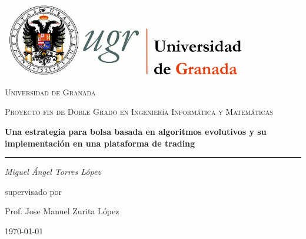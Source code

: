 	\afterpage{\blankpage}
	\begin{titlepage}
		\centering
		\includegraphics[width=0.8\textwidth]{imagenes/logo_ugr.jpg}\par\vspace{1cm}
		{\scshape\LARGE Universidad de Granada \par}
		\vspace{1cm}
		{\scshape\Large Proyecto fin de Doble Grado en Ingenier\'ia Inform\'atica y Matem\'aticas\par}
		\vspace{1.5cm}
		{\huge\bfseries Una estrategia para bolsa basada en algoritmos evolutivos y su implementaci\'on en una plataforma de trading\par}
		\vspace{0.2cm}
		\noindent\rule{\textwidth}{1pt}
		\vspace{2cm}
		{\Large\itshape Miguel \'Angel Torres L\'opez\par}
		\vfill
		supervisado por\par
		{\large Prof. Jose Manuel Zurita L\'opez}
		
		\vfill
		
		{\large \today\par}
			
	\end{titlepage}